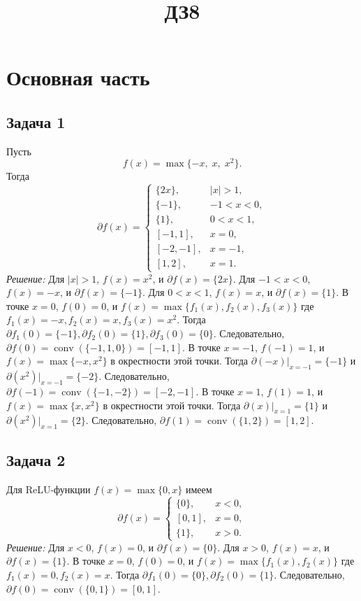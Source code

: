 \documentclass[12pt]{article}
\begin{document}
	\title{ДЗ8
	}
	\author{}
	\date{}
	\maketitle
	
	\section*{Основная часть}
	
	\subsection*{Задача 1}
	Пусть
	\[
	f(x)=\max\{-x,\;x,\;x^2\}.
	\]
	Тогда
	\[
	\partial f(x)=
	\begin{cases}
		\{2x\},&|x|>1,\\
		\{-1\},&-1<x<0,\\
		\{1\},&0<x<1,\\
		[-1,1],&x=0,\\
		[-2,-1],&x=-1,\\
		[1,2],&x=1.
	\end{cases}
	\]
	\textit{Решение:}
	Для $|x|>1$, $f(x)=x^2$, и $\partial f(x) = \{2x\}$.
	Для $-1<x<0$, $f(x)=-x$, и $\partial f(x) = \{-1\}$.
	Для $0<x<1$, $f(x)=x$, и $\partial f(x) = \{1\}$.
	В точке $x=0$, $f(0)=0$, и $f(x) = \max\{f_1(x), f_2(x), f_3(x)\}$ где $f_1(x)=-x, f_2(x)=x, f_3(x)=x^2$. Тогда $\partial f_1(0) = \{-1\}, \partial f_2(0) = \{1\}, \partial f_3(0) = \{0\}$. Следовательно, $\partial f(0) = \operatorname{conv}(\{-1, 1, 0\}) = [-1, 1]$.
	В точке $x=-1$, $f(-1)=1$, и $f(x) = \max\{-x, x^2\}$ в окрестности этой точки. Тогда $\partial (-x)|_{x=-1} = \{-1\}$ и $\partial (x^2)|_{x=-1} = \{-2\}$. Следовательно, $\partial f(-1) = \operatorname{conv}(\{-1, -2\}) = [-2, -1]$.
	В точке $x=1$, $f(1)=1$, и $f(x) = \max\{x, x^2\}$ в окрестности этой точки. Тогда $\partial (x)|_{x=1} = \{1\}$ и $\partial (x^2)|_{x=1} = \{2\}$. Следовательно, $\partial f(1) = \operatorname{conv}(\{1, 2\}) = [1, 2]$.
	
	\subsection*{Задача 2}
	Для ReLU-функции $f(x)=\max\{0,x\}$ имеем
	\[
	\partial f(x)=
	\begin{cases}
		\{0\},&x<0,\\
		[0,1],&x=0,\\
		\{1\},&x>0.
	\end{cases}
	\]
	\textit{Решение:}
	Для $x<0$, $f(x)=0$, и $\partial f(x) = \{0\}$.
	Для $x>0$, $f(x)=x$, и $\partial f(x) = \{1\}$.
	В точке $x=0$, $f(0)=0$, и $f(x) = \max\{f_1(x), f_2(x)\}$ где $f_1(x)=0, f_2(x)=x$. Тогда $\partial f_1(0) = \{0\}, \partial f_2(0) = \{1\}$. Следовательно, $\partial f(0) = \operatorname{conv}(\{0, 1\}) = [0, 1]$.
	
\end{document}
